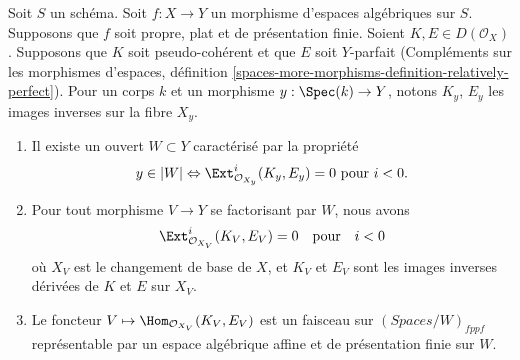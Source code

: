 \begin{lemma}
\label{lemma-complexes-open-neg-exts-vanishing}
Soit $S$ un schéma.
Soit $f : X \to Y$ un morphisme d'espaces algébriques sur $S$.
Supposons que $f$ soit propre, plat et de présentation finie.
Soient $K, E \in D(\mathcal{O}_X)$. Supposons que $K$ soit pseudo-cohérent et
que $E$ soit $Y$-parfait (Compléments sur les morphismes d'espaces, définition
\ref{spaces-more-morphisms-definition-relatively-perfect}).
Pour un corps $k$ et un morphisme $y : \Spec(k) \to Y$, notons $K_y$, $E_y$
les images inverses sur la fibre $X_y$.
\begin{enumerate}
\item Il existe un ouvert $W \subset Y$ caractérisé par la propriété
$$
y \in |W|
\Leftrightarrow
\Ext^i_{\mathcal{O}_{X_y}}(K_y, E_y) = 0
\text{ pour }i < 0.
$$
\item Pour tout morphisme $V \to Y$ se factorisant par $W$, nous avons
$$
\Ext^i_{\mathcal{O}_{X_V}}(K_V, E_V) = 0
\quad\text{pour}\quad i < 0
$$
où $X_V$ est le changement de base de $X$, et $K_V$ et $E_V$ sont les images
inverses dérivées de $K$ et $E$ sur $X_V$.
\item Le foncteur $V \mapsto \Hom_{\mathcal{O}_{X_V}}(K_V, E_V)$
est un faisceau sur $(\textit{Spaces}/W)_{fppf}$ représentable par un espace
algébrique affine et de présentation finie sur $W$.
\end{enumerate}
\end{lemma}

